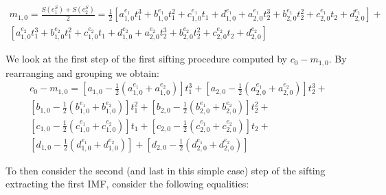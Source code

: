 \begin{equation}
\begin{split}
m_{1,0} =  \frac{S(e_1^S) + S(e_2^S)}{2} = \frac{1}{2} \left[ a_{1,0}^{e_1} t_1^3 + b_{1,0}^{e_1} t_1^2 + c_{1,0}^{e_1} t_1 + d_{1,0}^{e_1} + a_{2,0}^{e_1} t_2^3 + b_{2,0}^{e_1} t_2^2 + c_{2,0}^{e_1} t_2 + d_{2,0}^{e_1} \right] + \\
\left[ a_{1,0}^{e_2} t_1^3 + b_{1,0}^{e_2} t_1^2 + c_{1,0}^{e_2} t_1 + d_{1,0}^{e_2} + a_{2,0}^{e_2} t_2^3 + b_{2,0}^{e_2} t_2^2 + c_{2,0}^{e_2} t_2 + d_{2,0}^{e_2} \right]
\end{split}
\end{equation}

We look at the first step of the first sifting procedure computed by $c_0 - m_{1,0}$. By rearranging and grouping we obtain:
\begin{equation}
\label{first_ext}
\begin{split}
c_0 - m_{1,0} = \left[ a_{1,0} - \frac{1}{2} \left( a_{1,0}^{e_1} + a_{1,0}^{e_2}  \right) \right] t_1^3 + \left[ a_{2,0} - \frac{1}{2} \left( a_{2,0}^{e_1} + a_{2,0}^{e_2}  \right) \right] t_2^3 + \\
\left[ b_{1,0} - \frac{1}{2} \left( b_{1,0}^{e_1} + b_{1,0}^{e_2}  \right) \right] t_1^2 + \left[ b_{2,0} - \frac{1}{2} \left( b_{2,0}^{e_1} + b_{2,0}^{e_2}  \right) \right] t_2^2 + \\
\left[ c_{1,0} - \frac{1}{2} \left( c_{1,0}^{e_1} + c_{1,0}^{e_2}  \right) \right] t_1 + \left[ c_{2,0} - \frac{1}{2} \left( c_{2,0}^{e_1} + c_{2,0}^{e_2}  \right) \right] t_2 + \\
\left[ d_{1,0} - \frac{1}{2} \left( d_{1,0}^{e_1} + d_{1,0}^{e_2}  \right) \right] + \left[ d_{2,0} - \frac{1}{2} \left( d_{2,0}^{e_1} + d_{2,0}^{e_2}  \right) \right]
\end{split}
\end{equation}

To then consider the second (and last in this simple case) step of the sifting extracting the first IMF, consider the following equalities:

